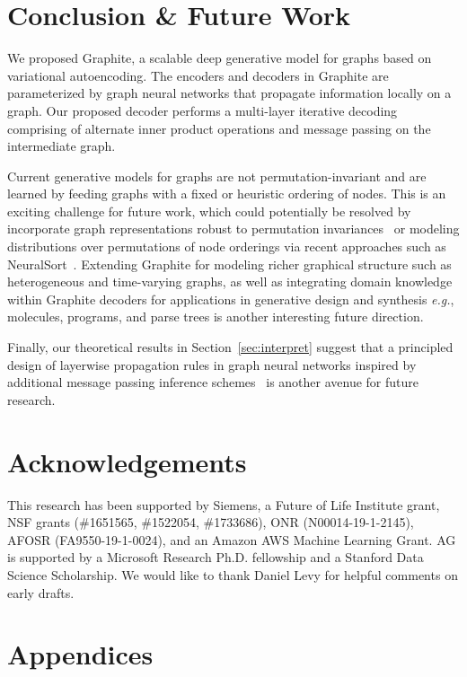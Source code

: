 \documentclass{article}
\newcommand{\name}{Graphite}
\begin{document}
 
 \section{Conclusion \& Future Work}
We proposed \name{}, a scalable deep generative model for graphs based on variational autoencoding. The encoders and decoders in \name{} are parameterized by graph neural networks that propagate information locally on a graph. 
Our proposed decoder performs a multi-layer iterative decoding comprising of alternate inner product operations and message passing on the intermediate graph.

Current generative models for graphs are not permutation-invariant and are learned by feeding graphs with a fixed or heuristic ordering of nodes.
This is an exciting challenge for future work, which could potentially be resolved by incorporate graph representations robust to permutation invariances~\citep{verma2017hunt} or modeling distributions over permutations of node orderings via recent approaches such as NeuralSort~\citep{grover2019stochastic}.
Extending \name{} for modeling richer graphical structure such as heterogeneous and time-varying graphs, as well as integrating domain knowledge within \name{} decoders for applications in generative design and synthesis \textit{e.g.}, molecules, programs, and parse trees is another interesting future direction. 

Finally, our theoretical results in Section~\ref{sec:interpret} suggest that a principled design of layerwise propagation rules in graph neural networks inspired by additional message passing inference schemes~\citep{dai2016discriminative,gilmer2017neural} is another avenue for future research. 

 \section*{Acknowledgements}
 This research has been supported by Siemens, a Future of Life Institute grant, NSF grants (\#1651565, \#1522054, \#1733686), ONR (N00014-19-1-2145), AFOSR (FA9550-19-1-0024), and an Amazon AWS Machine Learning Grant. AG is supported by a Microsoft Research Ph.D. fellowship and a Stanford Data Science Scholarship. We would like to thank Daniel Levy for helpful comments on early drafts. 




\clearpage
\appendix
\section*{Appendices}
\end{document}
